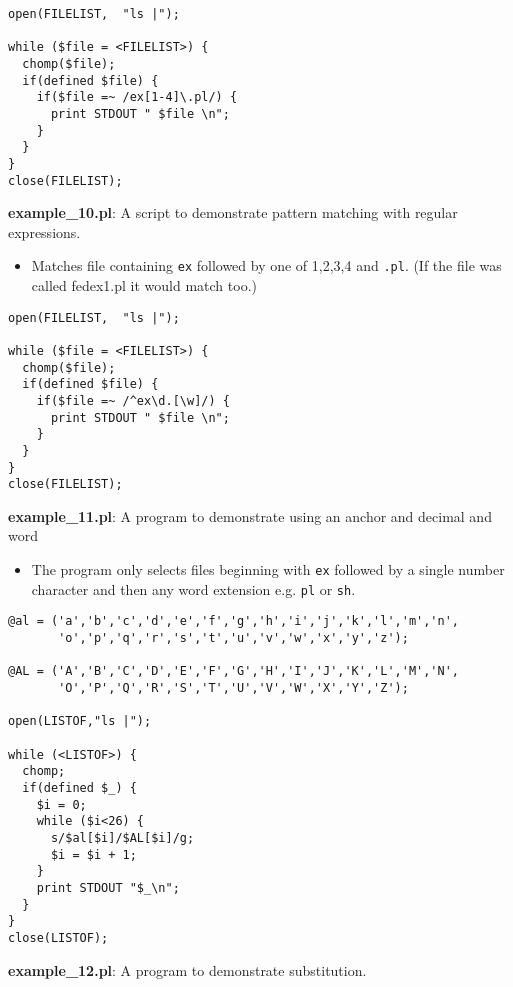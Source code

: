 \documentclass[17pt,dvips]{foils}
\begin{document}


\begin{verbatim}
open(FILELIST,  "ls |");

while ($file = <FILELIST>) {
  chomp($file);
  if(defined $file) {
    if($file =~ /ex[1-4]\.pl/) {
      print STDOUT " $file \n";
    }
  }
}
close(FILELIST);
\end{verbatim}
{\bf example\_10.pl}: A script to demonstrate pattern matching with regular
expressions.


\begin{itemize}
\item Matches file containing \texttt{ex} followed by one of 1,2,3,4
and \texttt{.pl}.  (If the file was called fedex1.pl it would match
too.)
\end{itemize}



\begin{verbatim}
open(FILELIST,  "ls |");

while ($file = <FILELIST>) {
  chomp($file);
  if(defined $file) {
    if($file =~ /^ex\d.[\w]/) {
      print STDOUT " $file \n";
    }
  }
}
close(FILELIST);
\end{verbatim}
{\bf example\_11.pl}: A program to demonstrate using an anchor and decimal and word

\begin{itemize}
\item The program only selects files beginning with \texttt{ex}
followed by a single number character and then any word extension
e.g. \texttt{pl} or \texttt{sh}.
\end{itemize}



\begin{verbatim}
@al = ('a','b','c','d','e','f','g','h','i','j','k','l','m','n',
       'o','p','q','r','s','t','u','v','w','x','y','z');

@AL = ('A','B','C','D','E','F','G','H','I','J','K','L','M','N',
       'O','P','Q','R','S','T','U','V','W','X','Y','Z');
     
open(LISTOF,"ls |");

while (<LISTOF>) {
  chomp;
  if(defined $_) {
    $i = 0;
    while ($i<26) {
      s/$al[$i]/$AL[$i]/g;
      $i = $i + 1;
    }
    print STDOUT "$_\n";
  }
}
close(LISTOF);
\end{verbatim}
{\bf example\_12.pl}: A program to demonstrate substitution.
\end{document}
